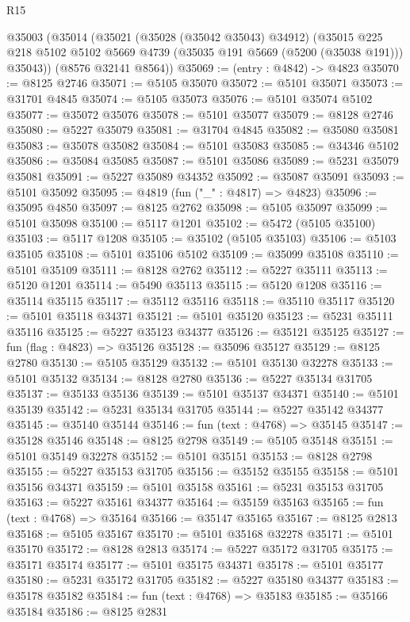 \begin{lexlean}{R15}
\begin{coremodule}
{{{{{{{{{{{  @35003
    (@35014
      (@35021
        (@35028 (@35042 @35043) @34912)
        (@35015 @225 @218 @5102 @5102 @5669 @4739 (@35035 @191 @5669 (@5200 (@35038 @191))) @35043))
      (@8576 @32141 @8564))
@35069 := (entry : @4842) -> @4823
@35070 := @8125 @2746
@35071 := @5105 @35070
@35072 := @5101 @35071
@35073 := @31701 @4845
@35074 := @5105 @35073
@35076 := @5101 @35074 @5102
@35077 := @35072 @35076
@35078 := @5101 @35077
@35079 := @8128 @2746
@35080 := @5227 @35079
@35081 := @31704 @4845
@35082 := @35080 @35081
@35083 := @35078 @35082
@35084 := @5101 @35083
@35085 := @34346 @5102
@35086 := @35084 @35085
@35087 := @5101 @35086
@35089 := @5231 @35079 @35081
@35091 := @5227 @35089 @34352
@35092 := @35087 @35091
@35093 := @5101 @35092
@35095 := @4819 (fun ("_" : @4817) => @4823)
@35096 := @35095 @4850
@35097 := @8125 @2762
@35098 := @5105 @35097
@35099 := @5101 @35098
@35100 := @5117 @1201
@35102 := @5472 (@5105 @35100)
@35103 := @5117 @1208
@35105 := @35102 (@5105 @35103)
@35106 := @5103 @35105
@35108 := @5101 @35106 @5102
@35109 := @35099 @35108
@35110 := @5101 @35109
@35111 := @8128 @2762
@35112 := @5227 @35111
@35113 := @5120 @1201
@35114 := @5490 @35113
@35115 := @5120 @1208
@35116 := @35114 @35115
@35117 := @35112 @35116
@35118 := @35110 @35117
@35120 := @5101 @35118 @34371
@35121 := @5101 @35120
@35123 := @5231 @35111 @35116
@35125 := @5227 @35123 @34377
@35126 := @35121 @35125
@35127 := fun (flag : @4823) => @35126
@35128 := @35096 @35127
@35129 := @8125 @2780
@35130 := @5105 @35129
@35132 := @5101 @35130 @32278
@35133 := @5101 @35132
@35134 := @8128 @2780
@35136 := @5227 @35134 @31705
@35137 := @35133 @35136
@35139 := @5101 @35137 @34371
@35140 := @5101 @35139
@35142 := @5231 @35134 @31705
@35144 := @5227 @35142 @34377
@35145 := @35140 @35144
@35146 := fun (text : @4768) => @35145
@35147 := @35128 @35146
@35148 := @8125 @2798
@35149 := @5105 @35148
@35151 := @5101 @35149 @32278
@35152 := @5101 @35151
@35153 := @8128 @2798
@35155 := @5227 @35153 @31705
@35156 := @35152 @35155
@35158 := @5101 @35156 @34371
@35159 := @5101 @35158
@35161 := @5231 @35153 @31705
@35163 := @5227 @35161 @34377
@35164 := @35159 @35163
@35165 := fun (text : @4768) => @35164
@35166 := @35147 @35165
@35167 := @8125 @2813
@35168 := @5105 @35167
@35170 := @5101 @35168 @32278
@35171 := @5101 @35170
@35172 := @8128 @2813
@35174 := @5227 @35172 @31705
@35175 := @35171 @35174
@35177 := @5101 @35175 @34371
@35178 := @5101 @35177
@35180 := @5231 @35172 @31705
@35182 := @5227 @35180 @34377
@35183 := @35178 @35182
@35184 := fun (text : @4768) => @35183
@35185 := @35166 @35184
@35186 := @8125 @2831
}}}}}}}}}}}
\end{coremodule}
\end{lexlean}
